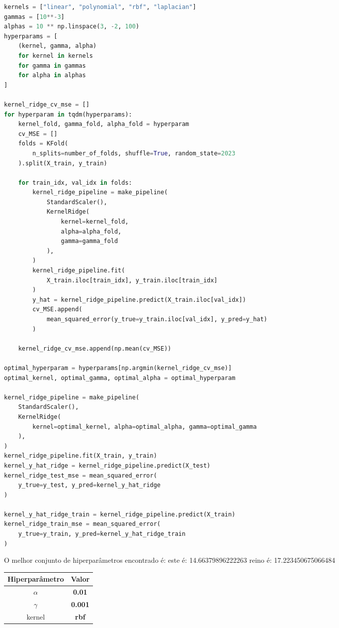 \begin{lstlisting}[language=Python]
kernels = ["linear", "polynomial", "rbf", "laplacian"]
gammas = [10**-3]
alphas = 10 ** np.linspace(3, -2, 100)
hyperparams = [
    (kernel, gamma, alpha)
    for kernel in kernels
    for gamma in gammas
    for alpha in alphas
]

kernel_ridge_cv_mse = []
for hyperparam in tqdm(hyperparams):
    kernel_fold, gamma_fold, alpha_fold = hyperparam
    cv_MSE = []
    folds = KFold(
        n_splits=number_of_folds, shuffle=True, random_state=2023
    ).split(X_train, y_train)

    for train_idx, val_idx in folds:
        kernel_ridge_pipeline = make_pipeline(
            StandardScaler(),
            KernelRidge(
                kernel=kernel_fold, 
                alpha=alpha_fold,
                gamma=gamma_fold
            ),
        )
        kernel_ridge_pipeline.fit(
            X_train.iloc[train_idx], y_train.iloc[train_idx]
        )
        y_hat = kernel_ridge_pipeline.predict(X_train.iloc[val_idx])
        cv_MSE.append(
            mean_squared_error(y_true=y_train.iloc[val_idx], y_pred=y_hat)
        )

    kernel_ridge_cv_mse.append(np.mean(cv_MSE))

optimal_hyperparam = hyperparams[np.argmin(kernel_ridge_cv_mse)]
optimal_kernel, optimal_gamma, optimal_alpha = optimal_hyperparam

kernel_ridge_pipeline = make_pipeline(
    StandardScaler(),
    KernelRidge(
        kernel=optimal_kernel, alpha=optimal_alpha, gamma=optimal_gamma
    ),
)
kernel_ridge_pipeline.fit(X_train, y_train)
kernel_y_hat_ridge = kernel_ridge_pipeline.predict(X_test)
kernel_ridge_test_mse = mean_squared_error(
    y_true=y_test, y_pred=kernel_y_hat_ridge
)

kernel_y_hat_ridge_train = kernel_ridge_pipeline.predict(X_train)
kernel_ridge_train_mse = mean_squared_error(
    y_true=y_train, y_pred=kernel_y_hat_ridge_train
)
\end{lstlisting}

O melhor conjunto de hiperparâmetros encontrado é:
este é: 14.66379896222263
reino é: 17.223450675066484

\begin{table}[h!]
    \centering
    \begin{tabular}{|c|c|}
        \hline
        Hiperparâmetro & Valor          \\ \hline
        $\alpha$       & \textbf{0.01}  \\
        $\gamma$       & \textbf{0.001} \\
        kernel         & \textbf{rbf}   \\ \hline
    \end{tabular}
\end{table}

